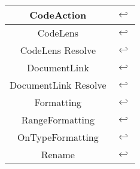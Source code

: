 \begin{figure}[H]
\begin{tabular}{|c|c|}
\hline
CodeAction & $\hookleftarrow$ \\
\hline
CodeLens & $\hookleftarrow$ \\
\hline
CodeLens Resolve & $\hookleftarrow$ \\
\hline
DocumentLink & $\hookleftarrow$ \\
\hline
DocumentLink Resolve & $\hookleftarrow$ \\
\hline
Formatting & $\hookleftarrow$ \\
\hline
RangeFormatting & $\hookleftarrow$ \\
\hline
OnTypeFormatting & $\hookleftarrow$ \\
\hline
Rename & $\hookleftarrow$ \\
\hline
\end{tabular}
\end{figure}

